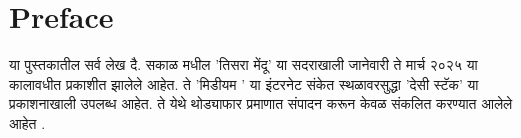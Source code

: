 \chapter*{Preface}

या पुस्तकातील सर्व लेख दै. सकाळ मधील 'तिसरा मेंदू' या सदराखाली जानेवारी ते मार्च २०२५  या कालावधीत प्रकाशीत झालेले आहेत.  ते 'मिडीयम ' या इंटरनेट संकेत स्थळावरसुद्धा 'देसी स्टॅक' या प्रकाशनाखाली उपलब्ध आहेत.  ते येथे थोड्याफार प्रमाणात संपादन करून केवळ संकलित करण्यात आलेले आहेत . 

